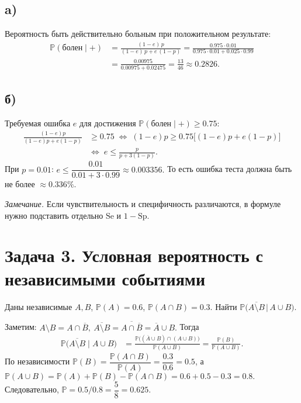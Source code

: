 \documentclass[12pt]{article}
\newcommand{\PP}{\mathbb{P}}
\begin{document}
\subsection*{a)} Вероятность быть действительно больным при положительном результате:
\begin{align*}
\PP(\text{болен}\mid +)
&=\frac{(1-e)\,p}{(1-e)\,p+e\,(1-p)}
=\frac{0.975\cdot 0.01}{0.975\cdot 0.01+0.025\cdot 0.99}\\
&=\frac{0.00975}{0.00975+0.02475}
=\frac{13}{46}\approx 0.2826.
\end{align*}

\subsection*{б)} Требуемая ошибка $e$ для достижения 
$\PP(\text{болен}\mid +)\ge 0.75$:
\begin{align*}
\frac{(1-e)p}{(1-e)p+e(1-p)}&\ge 0.75
\;\Longleftrightarrow\;
(1-e)p\ge 0.75\big[(1-e)p+e(1-p)\big]\\
&\Longleftrightarrow\;
e\le \frac{p}{p+3(1-p)}.
\end{align*}
При $p=0.01$:
\(
e\le \dfrac{0.01}{0.01+3\cdot 0.99}\approx 0.003356.
\)
То есть ошибка теста должна быть не более $\approx 0.336\%$.

\medskip
\textit{Замечание.} Если чувствительность и специфичность различаются, 
в формуле нужно подставить отдельно $\text{Se}$ и $1-\text{Sp}$.

\section*{Задача 3. Условная вероятность с независимыми событиями}
Даны независимые $A,B$, $\PP(A)=0.6$, $\PP(A\cap B)=0.3$.
Найти $\PP\!\big(\overline{A\setminus B}\,\big|\,A\cup B\big)$.

Заметим:
\(
A\setminus B=A\cap \overline B,\ 
\overline{A\setminus B}=\overline{A\cap \overline B}= \overline A\cup B.
\)
Тогда
\begin{align*}
\PP\big(\overline{A\setminus B}\mid A\cup B\big)
&=\frac{\PP\big((\overline A\cup B)\cap (A\cup B)\big)}{\PP(A\cup B)}
=\frac{\PP(B)}{\PP(A\cup B)}.
\end{align*}
По независимости $\PP(B)=\dfrac{\PP(A\cap B)}{\PP(A)}=\dfrac{0.3}{0.6}=0.5$, а
\(
\PP(A\cup B)=\PP(A)+\PP(B)-\PP(A\cap B)=0.6+0.5-0.3=0.8.
\)
Следовательно,
\(
\PP=0.5/0.8=\dfrac{5}{8}=0.625.
\)
\end{document}
